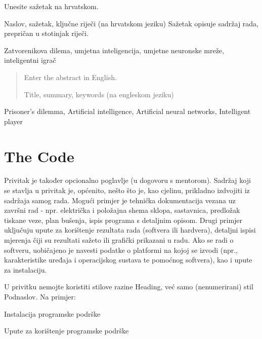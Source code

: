\documentclass[zavrsnirad]{fer}
\begin{document}
\begin{sazetak}
  Unesite sažetak na hrvatskom.

	Naslov, sažetak, ključne riječi (na hrvatskom jeziku)
	Sažetak opisuje sadržaj rada, prepričan u stotinjak riječi. 

\end{sazetak}

\begin{kljucnerijeci}
	Zatvorenikova dilema, umjetna inteligencija, umjetne neuronske mreže, inteligentni igrač
\end{kljucnerijeci}


\begin{abstract}
  Enter the abstract in English.
  
  Title, summary, keywords (na engleskom jeziku)
  
\end{abstract}

\begin{keywords}
  Prisoner's dilemma, Artificial intelligence, Artificial neural networks, Intelligent player
\end{keywords}



\backmatter

\chapter{The Code}

	Privitak je također opcionalno poglavlje (u dogovoru s mentorom). 
	Sadržaj koji se stavlja u privitak je, općenito, nešto što je, kao cjelinu, prikladno izdvojiti iz sadržaja samog rada.
	Mogući primjer je tehnička dokumentacija vezana uz završni rad - npr. električka i položajna shema sklopa, sastavnica, predložak tiskane veze, plan bušenja, ispis programa s detaljnim opisom.
	Drugi primjer uključuju upute za korištenje rezultata rada (softvera ili hardvera), detaljni ispisi mjerenja čiji su rezultati sažeto ili grafički prikazani u radu. Ako se radi o softveru, uobičajeno je navesti podatke o platformi na kojoj se izvodi (npr., karakteristike uređaja i operacijskog sustava te pomoćnog softvera), kao i upute za instalaciju. 
	
	U privitku nemojte koristiti stilove razine Heading, već samo (nenumerirani) stil Podnaslov. 
	Na primjer:
	
	Instalacija programske podrške
	
	Upute za korištenje programske podrške


\end{document}
